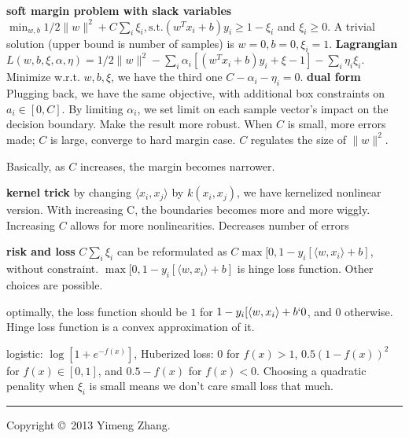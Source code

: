 \documentclass[10pt,landscape]{article}
\begin{document}
\begin{multicols}{3}
\textbf{soft margin problem with slack variables} $\min_{w,b} 1/2 \|w\|^2 + C\sum_i \xi_i, \text{s.t.} (w^T x_i + b)y_i \geq 1 - \xi_i$ and $\xi_i \geq 0$. A trivial solution (upper bound is number of samples) is $w=0, b=0, \xi_i = 1$. 
\textbf{Lagrangian} $L(w,b,\xi,\alpha,\eta) = 1/2 \|w\|^2 - \sum_i \alpha_i [(w^T x_i + b)y_i + \xi - 1] - \sum_i \eta_i \xi_i$. Minimize w.r.t. $w,b,\xi$, we have the third one $C-\alpha_i - \eta_i = 0$. 
\textbf{dual form} Plugging back, we have the same objective, with additional box constraints on $a_i \in [0,C]$.
By limiting $\alpha_i$, we set limit on each sample vector's impact on the decision boundary. Make the result more robust. When $C$ is small, more errors made; $C$ is large, converge to hard margin case. $C$ regulates the size of $\|w\|^2$.

Basically, as $C$ increases, the margin becomes narrower.

\textbf{kernel trick} by changing $\langle x_i, x_j \rangle$ by $k(x_i,x_j)$, we have kernelized nonlinear version. With increasing C, the boundaries becomes more and more wiggly. Increasing $C$ allows for more nonlinearities. Decreases number of errors

\textbf{risk and loss} $C\sum_i \xi_i$ can be reformulated as $C\max[0,1 - y_i [\langle w,x_i \rangle + b]$, without constraint. $\max[0,1 - y_i [\langle w,x_i \rangle + b]$ is hinge loss function. Other choices are possible. 

optimally, the loss function should be $1$ for $1 - y_i [\langle w,x_i \rangle + b \lq 0$, and $0$ otherwise. Hinge loss function is a convex approximation of it.

logistic: $\log [1+e^{-f(x)}]$, Huberized loss: $0$ for $f(x) > 1$, $0.5(1-f(x))^2$ for $f(x) \in [0,1]$, and $0.5 - f(x)$ for $f(x)<0$. Choosing a quadratic penality when $\xi_i$ is small means we don't care small loss that much.

\rule{0.3\linewidth}{0.25pt}
\scriptsize

Copyright \copyright\ 2013 Yimeng Zhang.

\end{multicols}
\end{document}
